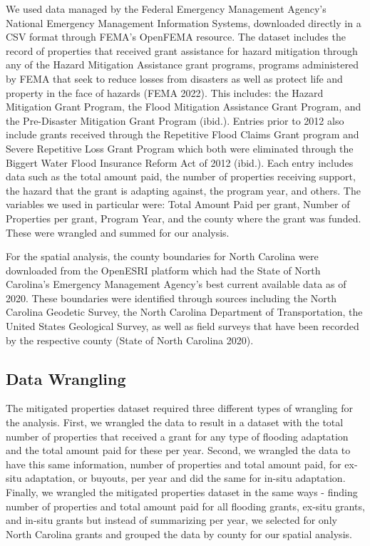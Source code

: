 \documentclass[
  12pt,
]{article}
\begin{document}
We used data managed by the Federal Emergency Management Agency's
National Emergency Management Information Systems, downloaded directly
in a CSV format through FEMA's OpenFEMA resource. The dataset includes
the record of properties that received grant assistance for hazard
mitigation through any of the Hazard Mitigation Assistance grant
programs, programs administered by FEMA that seek to reduce losses from
disasters as well as protect life and property in the face of hazards
(FEMA 2022). This includes: the Hazard Mitigation Grant Program, the
Flood Mitigation Assistance Grant Program, and the Pre-Disaster
Mitigation Grant Program (ibid.). Entries prior to 2012 also include
grants received through the Repetitive Flood Claims Grant program and
Severe Repetitive Loss Grant Program which both were eliminated through
the Biggert Water Flood Insurance Reform Act of 2012 (ibid.). Each entry
includes data such as the total amount paid, the number of properties
receiving support, the hazard that the grant is adapting against, the
program year, and others. The variables we used in particular were:
Total Amount Paid per grant, Number of Properties per grant, Program
Year, and the county where the grant was funded. These were wrangled and
summed for our analysis.

For the spatial analysis, the county boundaries for North Carolina were
downloaded from the OpenESRI platform which had the State of North
Carolina's Emergency Management Agency's best current available data as
of 2020. These boundaries were identified through sources including the
North Carolina Geodetic Survey, the North Carolina Department of
Transportation, the United States Geological Survey, as well as field
surveys that have been recorded by the respective county (State of North
Carolina 2020).

\hypertarget{data-wrangling}{%
\subsection{Data Wrangling}\label{data-wrangling}}

The mitigated properties dataset required three different types of
wrangling for the analysis. First, we wrangled the data to result in a
dataset with the total number of properties that received a grant for
any type of flooding adaptation and the total amount paid for these per
year. Second, we wrangled the data to have this same information, number
of properties and total amount paid, for ex-situ adaptation, or buyouts,
per year and did the same for in-situ adaptation. Finally, we wrangled
the mitigated properties dataset in the same ways - finding number of
properties and total amount paid for all flooding grants, ex-situ
grants, and in-situ grants but instead of summarizing per year, we
selected for only North Carolina grants and grouped the data by county
for our spatial analysis.
\end{document}
